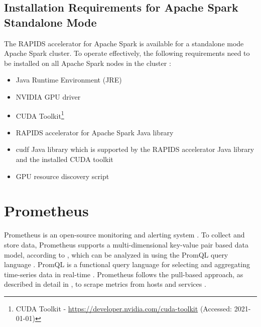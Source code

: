 \subsection{Installation Requirements for Apache Spark Standalone Mode}
\label{subsec:04_rapids_req}
The RAPIDS accelerator for Apache Spark is available for a standalone mode Apache Spark cluster. To operate effectively, the following requirements need to be installed on all Apache Spark nodes in the cluster \cite{SparkRapids2020Docs}:
\begin{itemize}
\item Java Runtime Environment (JRE)
\item NVIDIA GPU driver
\item CUDA Toolkit\footnote{CUDA Toolkit - \url{https://developer.nvidia.com/cuda-toolkit} (Accessed: 2021-01-01)}
\item RAPIDS accelerator for Apache Spark Java library
\item cudf Java library which is supported by the RAPIDS accelerator Java library and the installed CUDA toolkit
\item GPU resource discovery script
\end{itemize}


\section{Prometheus}
\label{sec:04_prom}
Prometheus is an open-source monitoring and alerting system \cite{Prom2020Docs}.
To collect and store data, Prometheus supports a multi-dimensional key-value pair based data model, according to , which can be analyzed in using the PromQL query language \cite{Pandey2020Monitoring}.
PromQL is a functional query language for selecting and aggregating time-series data in real-time \cite{Prom2020Docs}.
Prometheus follows the pull-based approach, as described in detail in , to scrape metrics from hosts and services \cite{Bastos2019Prom}.


